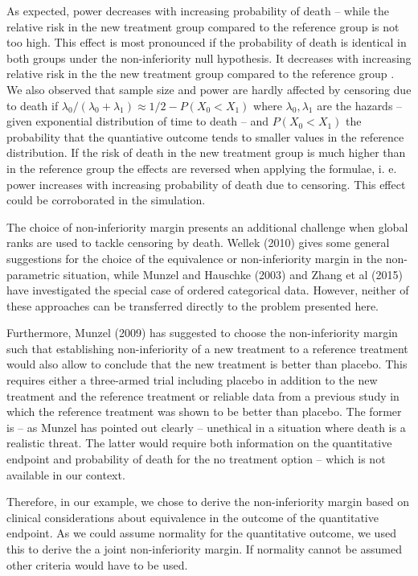 \documentclass[bimj,fleqn]{w-art}\usepackage[]{graphicx}\usepackage[]{color}
\theoremstyle{plain}
\theoremstyle{definition}
\begin{document}
As expected, power decreases with increasing probability of death -- while the
relative risk in the new treatment group compared to the reference group is not
too high. This effect is most pronounced if the probability of death is identical in
both groups under the non-inferiority null hypothesis. It decreases with increasing
relative risk in the the new treatment group compared to the reference group . We
also observed that sample size and power are hardly affected by censoring due to
death if $\lambda_0/(\lambda_0 + \lambda_1) \approx 1/2 - P(X_0 < X_1)$ where
$\lambda_0, \lambda_1$ are the hazards -- given exponential distribution of time
to death -- and $P(X_0 < X_1)$ the probability that the quantiative outcome tends
to smaller values in the reference distribution. If the risk of death in the new
treatment group is much higher  than in the reference group the effects are
reversed when applying the formulae, i. e. power increases with increasing
probability of death due to censoring. This effect could be corroborated in the
simulation.

The choice of non-inferiority margin presents an additional challenge when global
ranks are used to tackle censoring by death. Wellek (2010) gives some general
suggestions for the choice of the equivalence or non-inferiority margin in the
non-parametric situation, while Munzel and Hauschke (2003) and Zhang et al (2015)
have investigated the special case of ordered categorical data. However, neither
of these approaches can be transferred directly to the problem presented here.

Furthermore, Munzel (2009) has suggested to choose the non-inferiority margin
such that establishing non-inferiority of a new treatment to a reference
treatment would also allow to conclude that the new treatment is better than
placebo. This requires either a three-armed trial including placebo in addition
to the new treatment and the reference treatment or reliable data from a previous
study in which the reference treatment was shown to be better than placebo.
The former is -- as Munzel has pointed out clearly -- unethical in a situation where
death is a realistic threat. The latter would require both information on the
quantitative endpoint and probability of death for the no treatment option --
which is not available in our context.

Therefore, in our example, we chose to derive the non-inferiority margin based
on clinical considerations about equivalence in the outcome of the quantitative
endpoint. As we could assume normality for the quantitative outcome, we used this to
derive the a joint non-inferiority margin. If normality cannot be assumed
other criteria would have to be used.
\end{document}
